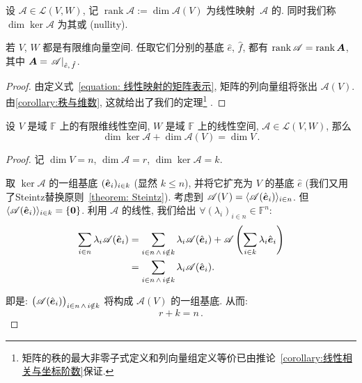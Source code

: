 \documentclass[openany, a5paper, oneside]{ctexbook}
\newcommand*{\inbasis}[2]{\left.%
	{#1}\right|_{#2}
}
\DeclareMathOperator{\rank}{rank}
\begin{document}
\begin{definition}[秩]
	设 $\mathscr A \in \mathcal L(V, W)$, 记 $\rank \mathscr A := \dim \mathscr A(V)$ 为线性映射~$\mathscr A$ 的.
	同时我们称 $\dim \ker \mathscr A$ 为其或 (nullity).
\end{definition}

\begin{theorem}
	若 $V$, $W$ 都是有限维向量空间. 任取它们分别的基底 $\hat e$, $\hat f$, 都有 $\rank \mathscr A = \rank \bv A$, 其中 $\bv A = \inbasis{\mathscr A}{\hat e,\, \hat f}$.
\end{theorem}
\begin{proof}
	由定义式~\eqref{equation: 线性映射的矩阵表示}, 矩阵的列向量组将张出 $\mathscr A (V)$.
	由\ref{corollary:秩与维数}, 这就给出了我们的定理\footnote{%
	矩阵的秩的最大非零子式定义和列向量组定义等价已由推论~\ref{corollary:线性相关与坐标阶数}保证.}%
	.
\end{proof}

\begin{theorem}\label{theorem: 核和像的维数}
	设 $V$ 是域 $\mathbb F$ 上的有限维线性空间, $W$ 是域 $\mathbb F$ 上的线性空间, $\mathscr A \in \mathcal L(V, W)$, 那么
	\begin{equation*}
		\dim \ker \mathscr A + \dim \mathscr A(V) = \dim V\,. 
	\end{equation*}
\end{theorem}
\begin{proof}
	记 $\dim V = n$, $\dim \mathscr A = r$, $\dim \ker \mathscr A = k$.

	取 $\ker \mathscr A$ 的一组基底 $(\hat{\boldsymbol{e}}_i)_{i \in k}$ (显然 $k \leq n$), 并将它扩充为 $V$ 的基底 $\hat e$ (我们又用了Steintz替换原则~\ref{theorem: Steintz}).
	考虑到 $\mathscr A(V) = \langle \mathscr A(\hat{\boldsymbol{e}}_i) \rangle_{i \in n}$.
	但 $\langle \mathscr A(\hat{\boldsymbol{e}}_i) \rangle_{i \in k} = \{\boldsymbol{0}\}$.
	利用 $\mathscr A$ 的线性, 我们给出 $\forall (\lambda_i)_{i \in n} \in \mathbb F^n$:
	\begin{align*}
		\sum_{i \in n} \lambda_i \mathscr A(\hat{\boldsymbol{e}}_i) 
			&= \sum_{i \in n\,\wedge\, i \notin k} \lambda_i \mathscr A(\hat{\boldsymbol{e}}_i) 
				+  \mathscr A\left( 
					\sum_{i \in k} \lambda_i \hat{\boldsymbol{e}}_i \right)
			\\
			&= \sum_{i \in n\,\wedge\, i \notin k} \lambda_i \mathscr A(\hat{\boldsymbol{e}}_i) .
	\end{align*}
	
	即是: $\big(\mathscr A(\hat{\boldsymbol{e}}_i)\big)_{i \in n\,\wedge\, i \notin k}$ 将构成 $\mathscr A(V)$ 的一组基底. 从而:
	\begin{equation*}
		r + k = n\,.
	\end{equation*}
\end{proof}
\end{document}
